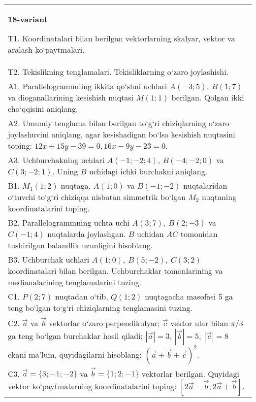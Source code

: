 \documentclass{article}
\begin{document}
\begin{tabular}{m{17cm}}
\textbf{18-variant}

T1. 
Koordinatalari bilan berilgan vektorlarning skalyar, vektor va aralash ko‘paytmalari.
 \\
T2. 
Tekislikning tenglamalari. Tekisliklarning o‘zaro joylashishi.
 \\
A1. 
Parallelogrammning ikkita qo‘shni uchlari $A (-3;5) $, $B (1;7) $
va dioganallarining kesishish nuqtasi $M (1;1)$ berilgan. Qolgan ikki
cho‘qqisini aniqlang.
 \\
A2. 
Umumiy tenglama bilan berilgan to‘g‘ri chiziqlarning
o‘zaro joylashuvini aniqlang, agar kesishadigan bo‘lsa kesishish nuqtasini
toping: $12x+15y-39=0, 16x-9y-23=0$.
 \\
A3. 
Uchburchakning uchlari
$A (- 1; - 2;4) $, $B (- 4; - 2;0) $ va $C (3; -2;1) $. Uning $B$ uchidagi
ichki burchakni aniqlang.
 \\
B1. 
\(M_{1} (1;2) \) nuqtaga, \(A (1;0) \) va \(B (-1;-2) \)
nuqtalaridan o‘tuvchi to‘g‘ri chiziqqa nisbatan simmetrik bo‘lgan \(M_{2}\) nuqtaning koordinatalarini toping.
 \\
B2. 
Parallelogrammning uchta uchi \(A (3;7),\ B (2;-3) \) va
\(C (-1;4) \) nuqtalarda joylashgan. $B$ uchidan $AC$
tomonidan tushirilgan balandlik uzunligini hisoblang.
 \\
B3. 
Uchburchak uchlari \(A (1;0),\ B (5;-2),\ C (3;2) \)
koordinatalari bilan berilgan. Uchburchaklar tomonlarining va
medianalarining tenglamalarini tuzing.
 \\
C1. 
\(P (2;7) \) nuqtadan o‘tib, \(Q (1;2) \) nuqtagacha
masofasi 5 ga teng bo‘lgan to‘g‘ri chiziqlarning tenglamasini tuzing.
 \\
C2. 
$\vec{a}$ va $\vec{b}$ vektorlar o‘zaro perpendikulyar; $\vec{c}$ vektor ular bilan $\pi/3$ ga teng bo‘lgan burchaklar hosil qiladi; $|\vec{a}| = 3$, $|\vec{b}| = 5,\ |\vec{c}| = 8$ ekani ma’lum, quyidagilarni hisoblang:
$ (\vec{a} + \vec{b} + \vec{c}) ^{2}$.
 \\
C3. 
$\vec{a} = \{ 3; - 1; - 2\}$ va $\vec{b} = \{ 1;2; - 1\}$ vektorlar berilgan. Quyidagi vektor ko‘paytmalarning koordinatalarini toping:
$\left\lbrack 2\vec{a} - \vec{b},2\vec{a} + \vec{b} \right\rbrack$.
 \\

\end{tabular}
\vspace{1cm}
\end{document}
